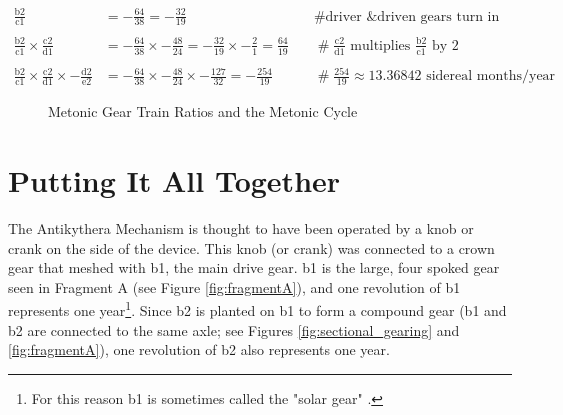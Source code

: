 \documentclass{article}
\theoremstyle{definition}
\begin{document}
\begin{equation*}
\begin{array}{lllll}
\frac{\text{b2}}{\text{c1}} 
&= - \frac{64}{38} = - \frac{32}{19}
		&\quad \mathrel{\#} \text{driver \& driven gears turn in
		opposite directions} \\ \\ \frac{\text{b2}}{\text{c1}} \times
		\frac{\text{c2}}{\text{d1}}
&= - \frac{64}{38} \times - \frac{48}{24} = - \frac{32}{19} \times - 
	\frac{2}{1} = \frac{64}{19} 
		&\quad \mathrel{\#} \frac{\text{c2}}{\text{d1}}
		\text{ multiplies $\frac{\text{b2}}{\text{c1}}$ by $2$}
		\\ \\ \frac{\text{b2}}{\text{c1}} \times
		\frac{\text{c2}}{\text{d1}} \times - \frac{\text{d2}}{\text{e2}}
&= - \frac{64}{38} \times - \frac{48}{24} \times - \frac{127}{32} = -\frac{254}{19} 
		& \quad \mathrel{\#} \frac{254}{19} \approx
		13.36842 \text{ sidereal months/year}
\end{array}
\end{equation*}


\bigskip
\begin{figure}[H]
\caption{Metonic Gear Train Ratios and the Metonic Cycle}
\label{fig:metonic_gear_ratios}
\end{figure}


\bigskip
\section{Putting It All Together}
The Antikythera Mechanism is thought to have been operated by a
knob or crank on the side of the device. This knob (or crank) was
connected to a crown gear that meshed with b1, the main drive
gear. b1 is the large, four spoked gear seen in Fragment A (see
Figure \ref{fig:fragmentA}), and one revolution of b1 represents
one year\footnote{For this reason b1 is sometimes called the
"solar gear" \cite{pin_and_slot_device}.}. Since b2 is planted on
b1 to form a compound gear (b1 and b2 are connected to the same
axle; see Figures \ref{fig:sectional_gearing} and
\ref{fig:fragmentA}), one revolution of b2 also represents one
year.
\end{document}
